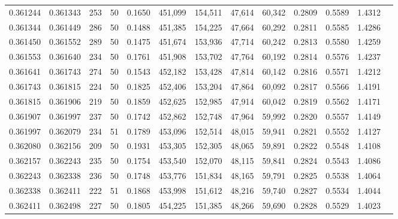 \begin{tabular}{rrrrrrrrrrrrr}
0.361244 & 0.361343 &   253 &  50 &                                     0.1650 & 451,099 & 154,511 &  47,614 &  60,342 & 0.2809 & 0.5589 & 1.4312 \\
0.361344 & 0.361449 &   286 &  50 &                                     0.1488 & 451,385 & 154,225 &  47,664 &  60,292 & 0.2811 & 0.5585 & 1.4286 \\
0.361450 & 0.361552 &   289 &  50 &                                     0.1475 & 451,674 & 153,936 &  47,714 &  60,242 & 0.2813 & 0.5580 & 1.4259 \\
0.361553 & 0.361640 &   234 &  50 &                                     0.1761 & 451,908 & 153,702 &  47,764 &  60,192 & 0.2814 & 0.5576 & 1.4237 \\
0.361641 & 0.361743 &   274 &  50 &                                     0.1543 & 452,182 & 153,428 &  47,814 &  60,142 & 0.2816 & 0.5571 & 1.4212 \\
0.361743 & 0.361815 &   224 &  50 &                                     0.1825 & 452,406 & 153,204 &  47,864 &  60,092 & 0.2817 & 0.5566 & 1.4191 \\
0.361815 & 0.361906 &   219 &  50 &                                     0.1859 & 452,625 & 152,985 &  47,914 &  60,042 & 0.2819 & 0.5562 & 1.4171 \\
0.361907 & 0.361997 &   237 &  50 &                                     0.1742 & 452,862 & 152,748 &  47,964 &  59,992 & 0.2820 & 0.5557 & 1.4149 \\
0.361997 & 0.362079 &   234 &  51 &                                     0.1789 & 453,096 & 152,514 &  48,015 &  59,941 & 0.2821 & 0.5552 & 1.4127 \\
0.362080 & 0.362156 &   209 &  50 &                                     0.1931 & 453,305 & 152,305 &  48,065 &  59,891 & 0.2822 & 0.5548 & 1.4108 \\
0.362157 & 0.362243 &   235 &  50 &                                     0.1754 & 453,540 & 152,070 &  48,115 &  59,841 & 0.2824 & 0.5543 & 1.4086 \\
0.362243 & 0.362338 &   236 &  50 &                                     0.1748 & 453,776 & 151,834 &  48,165 &  59,791 & 0.2825 & 0.5538 & 1.4064 \\
0.362338 & 0.362411 &   222 &  51 &                                     0.1868 & 453,998 & 151,612 &  48,216 &  59,740 & 0.2827 & 0.5534 & 1.4044 \\
0.362411 & 0.362498 &   227 &  50 &                                     0.1805 & 454,225 & 151,385 &  48,266 &  59,690 & 0.2828 & 0.5529 & 1.4023 \\

\end{tabular}

